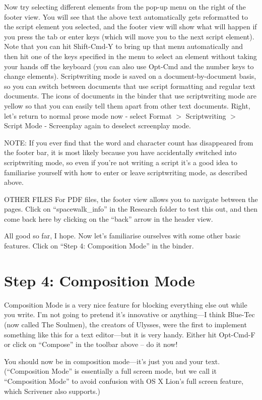 \documentclass[10pt,oneside]{memoir}
\begin{document}
Now try selecting different elements from the pop-up menu on the right of the footer view. You will see that the above text automatically gets reformatted to the script element you selected, and the footer view will show what will happen if you press the tab or enter keys (which will move you to the next script element). Note that you can hit Shift-Cmd-Y to bring up that menu automatically and then hit one of the keys specified in the menu to select an element without taking your hands off the keyboard (you can also use Opt-Cmd and the number keys to change elements).
Scriptwriting mode is saved on a document-by-document basis, so you can switch between documents that use script formatting and regular text documents. The icons of documents in the binder that use scriptwriting mode are yellow so that you can easily tell them apart from other text documents.
Right, let's return to normal prose mode now - select Format $>$ Scriptwriting $>$ Script Mode - Screenplay again to deselect screenplay mode.


NOTE:
If you ever find that the word and character count has disappeared from the footer bar, it is most likely because you have accidentally switched into scriptwriting mode, so even if you're not writing a script it's a good idea to familiarise yourself with how to enter or leave scriptwriting mode, as described above.


OTHER FILES
For PDF files, the footer view allows you to navigate between the pages. Click on ``spacewalk\_info'' in the Research folder to test this out, and then come back here by clicking on the ``back'' arrow in the header view.


All good so far, I hope. Now let's familiarise ourselves with some other basic features. Click on ``Step 4: Composition Mode'' in the binder.


\pagebreak \chapter{Step 4: Composition Mode}
\label{step4:compositionmode}

Composition Mode is a very nice feature for blocking everything else out while you write. I'm not going to pretend it's innovative or anything---I think Blue-Tec (now called The Soulmen), the creators of Ulysses, were the first to implement something like this for a text editor---but it is very handy. Either hit Opt-Cmd-F or click on ``Compose'' in the toolbar above -- do it now!


You should now be in composition mode---it's just you and your text. (``Composition Mode'' is essentially a full screen mode, but we call it ``Composition Mode'' to avoid confusion with OS X Lion's full screen feature, which Scrivener also supports.)
\end{document}
